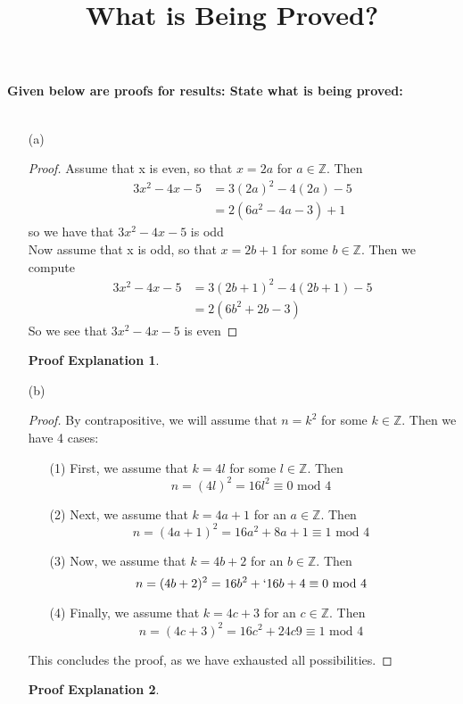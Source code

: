 \documentclass[12pt]{article}
\newcommand{\ZZ}{\mathbb{Z}}
\theoremstyle{plain}
\theoremstyle{plain}
\theoremstyle{definition}
\newtheorem*{remark}{Proof Explanation}
\begin{document}
 
\title{What is Being Proved?}
\date{}
\maketitle 

\noindent \textbf{Given below are proofs for results: State what is being proved:} \\
\\
\begin{enumerate}
    \item [(a)] \begin{proof}
Assume that x is even, so that \(x = 2a\) for \(a \in \ZZ\). Then \begin{align*}
    3x^2 - 4x - 5 & = 3(2a)^2 - 4(2a) - 5\\
    & = 2 (6a^2 - 4a -3) + 1
\end{align*} so we have that \(3x ^2 - 4x - 5 \) is odd\\
\noindent Now assume that x is odd, so that \(x = 2b +1 \) for some \(b \in \ZZ\). Then we compute \begin{align*}
    3x^2 - 4x - 5 & = 3(2b+1)^2 - 4(2b+1) - 5\\
    & = 2 (6b^2 +2b -3)
\end{align*} So we see that \(3x ^2 - 4x - 5 \) is even
\end{proof}
\begin{remark}
\end{remark}
    \item [(b)] \begin{proof}
    By contrapositive, we will assume that \(n = k^2 \) for some \(k \in \ZZ\). Then we have 4 cases: \begin{enumerate}
        \item [(1)] First, we assume that \(k = 4l \) for some \(l \in \ZZ\). Then \[n = (4l)^2 = 16l^2 \equiv 0 \text{  mod 4  }\]
        \item [(2)] Next, we assume that \(k= 4a + 1\) for an \(a \in \ZZ\). Then \[n = (4a+1)^2 = 16a^2+8a+1 \equiv 1  \text{  mod 4  }\] 
        \item [(3)] Now, we assume that \(k= 4b + 2\) for an \(b \in \ZZ\). Then \[n = (4b+2)^2 = 16b^2 +`16b + 4 \equiv 0 \text{  mod 4  } \]
        \item [(4)] Finally, we assume that \(k= 4c + 3\) for an \(c \in \ZZ\). Then \[n = (4c+3)^2 = 16c^2 +24c 9 \equiv 1 \text{  mod 4  }\] 
    \end{enumerate} This concludes the proof, as we have exhausted all possibilities. 
\end{proof}
\begin{remark}
\end{remark}
\end{enumerate} 
\end{document}
